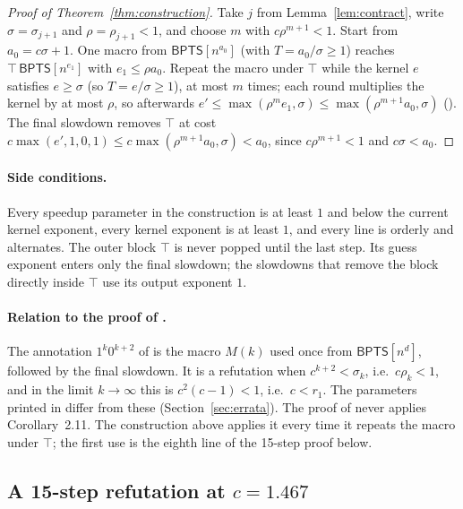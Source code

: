 \documentclass[11pt]{article}
\theoremstyle{definition}
\newcommand{\BPTS}{\mathsf{BPTS}}
\newcommand{\leanus}{\textunderscore\allowbreak}
\newcommand{\lean}[1]{\ifmmode\text{\ttfamily #1}\else{\ttfamily\let\_\leanus #1}\fi}
\begin{document}
\begin{proof}[Proof of Theorem~\ref{thm:construction}]
Take $j$ from Lemma~\ref{lem:contract}, write $\sigma=\sigma_{j+1}$ and $\rho=\rho_{j+1}<1$, and choose $m$ with $c\rho^{m+1}<1$. Start from $a_0=c\sigma+1$. One macro from $\BPTS[n^{a_0}]$ (with $T=a_0/\sigma\ge1$) reaches $\top\,\BPTS[n^{e_1}]$ with $e_1\le\rho a_0$. Repeat the macro under $\top$ while the kernel $e$ satisfies $e\ge\sigma$ (so $T=e/\sigma\ge1$), at most $m$ times; each round multiplies the kernel by at most $\rho$, so afterwards $e'\le\max(\rho^{m}e_1,\sigma)\le\max(\rho^{m+1}a_0,\sigma)$ (\lean{MWG.iter}). The final slowdown removes $\top$ at cost $c\max(e',1,0,1)\le c\max(\rho^{m+1}a_0,\sigma)<a_0$, since $c\rho^{m+1}<1$ and $c\sigma<a_0$.
\end{proof}

\paragraph{Side conditions.}
Every speedup parameter in the construction is at least $1$ and below the current kernel exponent, every kernel exponent is at least $1$, and every line is orderly and alternates. The outer block $\top$ is never popped until the last step. Its guess exponent enters only the final slowdown; the slowdowns that remove the block directly inside $\top$ use its output exponent $1$.

\paragraph{Relation to the proof of \cite[Theorem~5.3]{MW21}.}
The annotation $1^k0^{k+2}$ of \cite[Theorem~5.3]{MW21} is the macro $M(k)$ used once from $\BPTS[n^d]$, followed by the final slowdown. It is a refutation when $c^{k+2}<\sigma_k$, i.e.\ $c\rho_k<1$, and in the limit $k\to\infty$ this is $c^2(c-1)<1$, i.e.\ $c<r_1$. The parameters printed in \cite{MW21} differ from these (Section~\ref{sec:errata}). The proof of \cite[Theorem~5.3]{MW21} never applies Corollary~2.11. The construction above applies it every time it repeats the macro under $\top$; the first use is the eighth line of the 15-step proof below.

\subsection{A 15-step refutation at \texorpdfstring{$c=1.467$}{c = 1.467}}\label{sec:fifteen}
\end{document}
